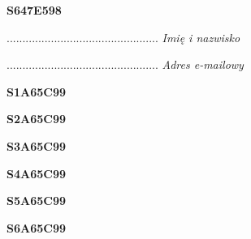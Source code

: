 \begin{turn}{90}\huge \textbf{S647E598}\end{turn}

\begin{turn}{90}\begin{minipage}{\linewidth} \vspace{20mm} ................................................  \textit{Imię i nazwisko}\end{minipage}\end{turn}

\begin{turn}{90}\begin{minipage}{\linewidth} \vspace{20mm} ................................................  \textit{Adres e-mailowy}\end{minipage}\end{turn}

\begin{turn}{90}\huge \textbf{S1A65C99}\end{turn}

\begin{turn}{90}\huge \textbf{S2A65C99}\end{turn}

\begin{turn}{90}\huge \textbf{S3A65C99}\end{turn}

\begin{turn}{90}\huge \textbf{S4A65C99}\end{turn}

\begin{turn}{90}\huge \textbf{S5A65C99}\end{turn}

\begin{turn}{90}\huge \textbf{S6A65C99}\end{turn}